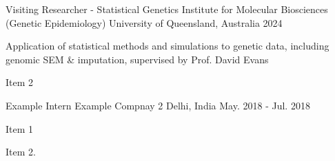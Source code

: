 

\begin{cventries}

  \cventry
    {Visiting Researcher - Statistical Genetics} %
    {Institute for Molecular Biosciences (Genetic Epidemiology)} %
    {University of Queensland, Australia﻿} %
    {2024} %
    {
      \begin{cvitems} %
        \item Application of statistical methods and simulations to genetic data, including genomic SEM & imputation, supervised by Prof. David Evans
    \item {Item 2}
      \end{cvitems}
    }

  \cventry
    {Example Intern} %
    {Example Compnay 2} %
    {Delhi, India} %
    {May. 2018 - Jul. 2018} %
    {
      \begin{cvitems} %
        \item {Item 1}
        \item {Item 2.}
      \end{cvitems}
    }

\end{cventries}
